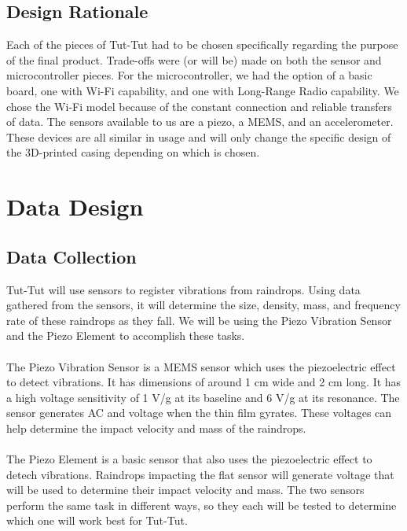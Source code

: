 \documentclass[letterpaper,10pt,draftclsnofoot,onecolumn]{article}
\begin{document}
\subsection{Design Rationale}
Each of the pieces of Tut-Tut had to be chosen specifically regarding the purpose of the final product. Trade-offs were (or will be) made on both the sensor and microcontroller pieces. For the microcontroller, we had the option of a basic board, one with Wi-Fi capability, and one with Long-Range Radio capability. We chose the Wi-Fi model because of the constant connection and reliable transfers of data. The sensors available to us are a piezo, a MEMS, and an accelerometer. These devices are all similar in usage and will only change the specific design of the 3D-printed casing depending on which is chosen.


\section{Data Design}

\subsection{Data Collection}
Tut-Tut will use sensors to register vibrations from raindrops. Using data gathered from the sensors, it will determine the size, density, mass, and frequency rate of these raindrops as they fall. We will be using the Piezo Vibration Sensor and the Piezo Element to accomplish these tasks. 
\\
\\
The Piezo Vibration Sensor is a MEMS sensor which uses the piezoelectric effect to detect vibrations. It has dimensions of around 1 cm wide and 2 cm long. It has a high voltage sensitivity of 1 V/g at its baseline and 6 V/g at its resonance. The sensor generates AC and voltage when the thin film gyrates. These voltages can help determine the impact velocity and mass of the raindrops.
\\
\\
The Piezo Element is a basic sensor that also uses the piezoelectric effect to detech vibrations. Raindrops impacting the flat sensor will generate voltage that will be used to determine their impact velocity and mass. The two sensors perform the same task in different ways, so they each will be tested to determine which one will work best for Tut-Tut.
\end{document}
